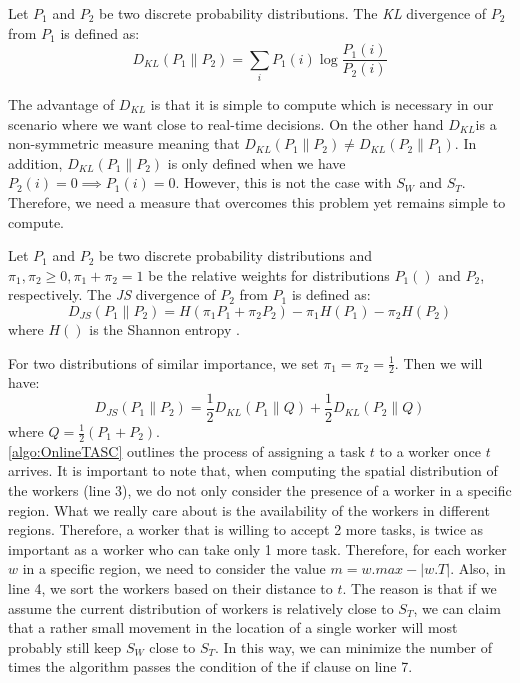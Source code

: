 \begin{definition}
\label{def:KLD}
Let $P_1$ and $P_2$ be two discrete probability distributions. The \emph{KL} divergence \cite{Kullback51} of $P_2$ from $P_1$ is defined as:
\begin{equation*}
D_{KL}\left( P_1 \parallel P_2 \right) = \sum_i P_1(i) \log \frac{P_1(i)}{P_2(i)}
\end{equation*}
\end{definition}

The advantage of $D_{KL}$ is that it is simple to compute which is necessary in our scenario where we want close to real-time decisions. On the other hand $D_{KL}$is a non-symmetric measure meaning that $D_{KL}(P_1 \parallel P_2) \neq D_{KL}(P_2 \parallel P_1)$. In addition, $D_{KL}(P_1 \parallel P_2)$ is only defined when we have $P_2(i) = 0 \implies P_1(i) = 0$. However, this is not the case with $S_W$ and $S_T$. Therefore, we need a measure that overcomes this problem yet remains simple to compute.

\begin{definition}
Let $P_1$ and $P_2$ be two discrete probability distributions and $\pi_1, \pi_2 \geq 0, \pi_1 + \pi_2 = 1$ be the relative weights for distributions $P_1()$ and $P_2$, respectively. The \emph{JS} divergence \cite{Lin91} of $P_2$ from $P_1$ is defined as:
\begin{equation*}
D_{JS}\left( P_1 \parallel P_2 \right) = H \left( \pi_1P_1 + \pi_2P_2 \right) - \pi_1H\left( P_1 \right) - \pi_2H\left( P_2 \right)
\end{equation*}
where $H()$ is the Shannon entropy \cite{Shannon48}.
\end{definition}

For two distributions of similar importance, we set $\pi_1 = \pi_2 = \frac{1}{2}$. Then we will have:
\begin{equation*}
D_{JS}\left( P_1 \parallel P_2 \right) = \frac{1}{2}D_{KL} \left( P_1 \parallel Q \right) + \frac{1}{2}D_{KL} \left( P_2 \parallel Q \right)
\end{equation*}
where $Q = \frac{1}{2} \left( P_1 + P_2 \right)$.\\

\cref{algo:OnlineTASC} outlines the process of assigning a task $t$ to a worker once $t$ arrives. It is important to note that, when computing the spatial distribution of the workers (line 3), we do not only consider the presence of a worker in a specific region. What we really care about is the availability of the workers in different regions. Therefore, a worker that is willing to accept 2 more tasks, is twice as important as a worker who can take only 1 more task. Therefore, for each worker $w$ in a specific region, we need to consider the value $m = w.max - \left\vert w.T \right\vert$. Also, in line 4, we sort the workers based on their distance to $t$. The reason is that if we assume the current distribution of workers is relatively close to $S_T$, we can claim that a rather small movement in the location of a single worker will most probably still keep $S_W$ close to $S_T$. In this way, we can minimize the number of times the algorithm passes the condition of the if clause on line 7. 

